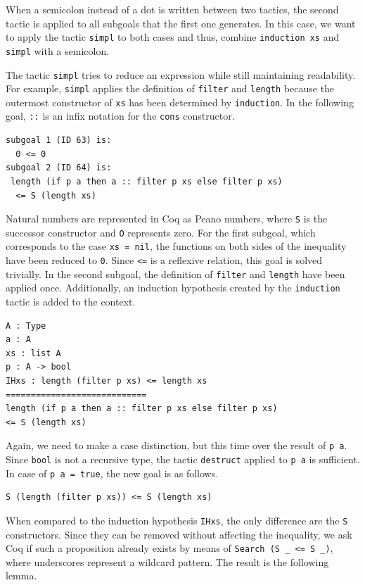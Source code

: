 \documentclass[a4paper, 11pt, fleqn, twoside, abstract=on]{scrreprt}
\newcommand{\cinl}[1]{\texttt{#1}}
\begin{document}
When a semicolon instead of a dot is written between two tactics, the second tactic is applied to all subgoals that the first one generates.
In this case, we want to apply the tactic \cinl{simpl} to both cases and thus, combine \cinl{induction xs} and \cinl{simpl} with a semicolon.

The tactic \cinl{simpl} tries to reduce an expression while still maintaining readability.
For example, \cinl{simpl} applies the definition of \cinl{filter} and \cinl{length} because the outermost constructor of \cinl{xs} has been determined by \cinl{induction}.
In the following goal, \cinl{::} is an infix notation for the \cinl{cons} constructor.

\begin{verbatim}
subgoal 1 (ID 63) is:
  0 <= 0
subgoal 2 (ID 64) is:
 length (if p a then a :: filter p xs else filter p xs) 
  <= S (length xs)
\end{verbatim}

Natural numbers are represented in Coq as Peano numbers, where \cinl{S} is the successor constructor and \cinl{O} represents zero.
For the first subgoal, which corresponds to the case \cinl{xs = nil}, the functions on both sides of the inequality have been reduced to \cinl{0}.
Since \cinl{<=} is a reflexive relation, this goal is solved trivially.
In the second subgoal, the definition of \cinl{filter} and \cinl{length} have been applied once.
Additionally, an induction hypothesis created by the \cinl{induction} tactic is added to the context.

\begin{verbatim}
A : Type
a : A
xs : list A
p : A -> bool
IHxs : length (filter p xs) <= length xs
============================
length (if p a then a :: filter p xs else filter p xs)
<= S (length xs)
\end{verbatim}

Again, we need to make a case distinction, but this time over the result of \cinl{p a}.
Since \cinl{bool} is not a recursive type, the tactic \cinl{destruct} applied to \cinl{p a} is sufficient.
In case of \cinl{p a = true}, the new goal is as follows.

\begin{verbatim}
S (length (filter p xs)) <= S (length xs)
\end{verbatim}
\noindent
When compared to the induction hypothesis \cinl{IHxs}, the only difference are the \cinl{S} constructors.
Since they can be removed without affecting the inequality, we ask Coq if such a proposition already exists by means of \cinl{Search (S _ <= S _)}, where underscores represent a wildcard pattern.
The result is the following lemma.
\end{document}
